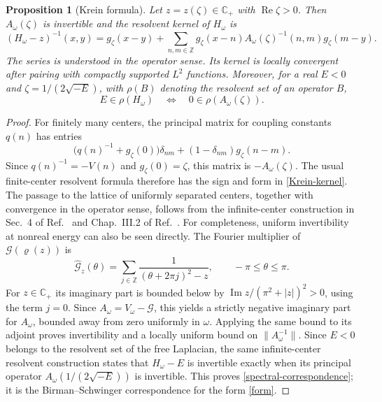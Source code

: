 \documentclass[12pt,a4paper]{article}
\numberwithin{equation}{section}
\newcommand{\refcite}[1]{\cite{#1}}
\newcommand{\C}{\mathbb C}
\newcommand{\Z}{\mathbb Z}
\newcommand{\cG}{\mathcal G}
\renewcommand{\Re}{\operatorname{Re}}
\renewcommand{\Im}{\operatorname{Im}}
\newtheorem{prop}[thm]{Proposition}
\begin{document}
\begin{prop}[Krein formula]\label{prop:krein}
Let $z=z(\zeta)\in\C_+$ with $\Re\zeta>0$.  Then
$A_\omega(\zeta)$ is invertible and the resolvent kernel of $H_\omega$ is
\begin{equation}
(H_\omega-z)^{-1}(x,y)
 =g_\zeta(x-y)
 +\sum_{n,m\in\Z}g_\zeta(x-n)
 A_\omega(\zeta)^{-1}(n,m)g_\zeta(m-y).
\label{Krein-kernel}
\end{equation}
The series is understood in the operator sense.  Its kernel is locally
convergent after pairing with compactly supported $L^2$ functions.
Moreover, for a real $E<0$ and $\zeta=1/(2\sqrt{-E})$, with
$\rho(B)$ denoting the resolvent set of an operator $B$,
\begin{equation}
 E\in\rho(H_\omega)\quad\Longleftrightarrow\quad
 0\in\rho(A_\omega(\zeta)).
\label{spectral-correspondence}
\end{equation}
\end{prop}

\begin{proof}
For finitely many centers, the principal matrix for coupling constants
$q(n)$ has entries
$$
\bigl(q(n)^{-1}+g_\zeta(0)\bigr)\delta_{nm}
 +(1-\delta_{nm})g_\zeta(n-m).
$$
Since $q(n)^{-1}=-V(n)$ and $g_\zeta(0)=\zeta$, this matrix is
$-A_\omega(\zeta)$.  The usual finite-center resolvent formula therefore
has the sign and form in \eqref{Krein-kernel}.  The passage to the lattice of
uniformly separated centers, together with convergence in the operator sense,
follows from the infinite-center construction in Sec.~4 of
Ref.~\refcite{AlbeverioEtAl1984} and Chap.~III.2 of
Ref.~\refcite{Albeverio2005}.  For completeness, uniform invertibility at
nonreal energy can also be seen directly.  The Fourier multiplier of
$\cG(\varrho(z))$ is
\begin{equation}
 \widehat{\cG}_z(\theta)
 =\sum_{j\in\Z}\frac{1}{(\theta+2\pi j)^2-z},
 \qquad -\pi\le\theta\le\pi.
\label{G-Fourier}
\end{equation}
For $z\in\C_+$ its imaginary part is bounded below by
$\Im z/(\pi^2+|z|)^2>0$, using the term $j=0$.  Since
$A_\omega=V_\omega-\cG$, this yields a strictly negative imaginary part for
$A_\omega$, bounded away from zero uniformly in $\omega$.  Applying the same
bound to its adjoint proves invertibility and a locally uniform bound on
$\|A_\omega^{-1}\|$.  Since $E<0$ belongs to the resolvent set of the free
Laplacian, the same infinite-center resolvent construction states that
$H_\omega-E$ is invertible exactly when its principal operator
$A_\omega(1/(2\sqrt{-E}))$ is invertible.  This proves
\eqref{spectral-correspondence}; it is the Birman--Schwinger correspondence
for the form \eqref{form}.
\end{proof}
\end{document}
